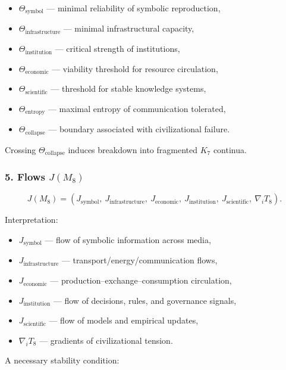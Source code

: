 \begin{itemize}
    \item $\Theta_{\mathrm{symbol}}$ — minimal reliability of symbolic reproduction,
    \item $\Theta_{\mathrm{infrastructure}}$ — minimal infrastructural capacity,
    \item $\Theta_{\mathrm{institution}}$ — critical strength of institutions,
    \item $\Theta_{\mathrm{economic}}$ — viability threshold for resource circulation,
    \item $\Theta_{\mathrm{scientific}}$ — threshold for stable knowledge systems,
    \item $\Theta_{\mathrm{entropy}}$ — maximal entropy of communication tolerated,
    \item $\Theta_{\mathrm{collapse}}$ — boundary associated with civilizational failure.
\end{itemize}

Crossing $\Theta_{\mathrm{collapse}}$ induces breakdown into fragmented $K_7$ continua.

\subsubsection*{5. Flows \texorpdfstring{$J(M_8)$}{J(M_8)}}

\[
J(M_8)=
(J_{\mathrm{symbol}},\
J_{\mathrm{infrastructure}},\
J_{\mathrm{economic}},\
J_{\mathrm{institution}},\
J_{\mathrm{scientific}},\
\nabla_i T_8).
\]

Interpretation:

\begin{itemize}
    \item $J_{\mathrm{symbol}}$ — flow of symbolic information across media,
    \item $J_{\mathrm{infrastructure}}$ — transport/energy/communication flows,
    \item $J_{\mathrm{economic}}$ — production–exchange–consumption circulation,
    \item $J_{\mathrm{institution}}$ — flow of decisions, rules, and governance signals,
    \item $J_{\mathrm{scientific}}$ — flow of models and empirical updates,
    \item $\nabla_i T_8$ — gradients of civilizational tension.
\end{itemize}

A necessary stability condition:


